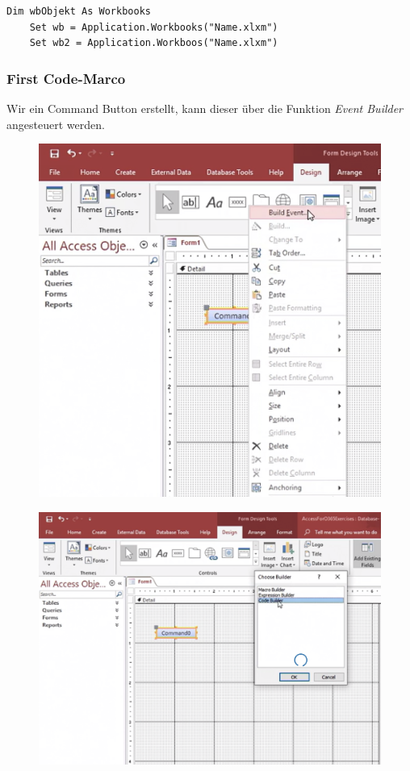 \begin{lstlisting}[style=VBA]
	Dim wbObjekt As Workbooks 
	Set wb = Application.Workbooks("Name.xlxm")
	Set wb2 = Application.Workboos("Name.xlxm")
\end{lstlisting} 

\subsubsection{First Code-Marco}
Wir ein Command Button erstellt, kann dieser über die Funktion \textit{Event Builder} angesteuert werden.

\begin{figure}[H]
	\centering
	\includegraphics[scale = 0.3]{attachment/chapter_2/Scc022}
	\caption{}
	\label{fig:Scc022}
\end{figure} 

\begin{figure}[H]
	\centering
	\includegraphics[scale = 0.3]{attachment/chapter_2/Scc023}
	\caption{}
	\label{fig:Scc023}
\end{figure} 


